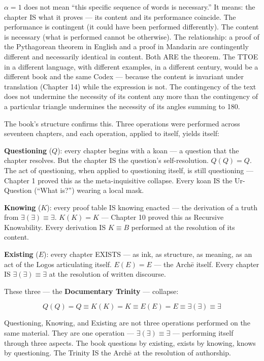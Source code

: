 \documentclass[10pt, openany, oneside]{book}
\begin{document}
$\alpha = 1$ does not mean ``this specific sequence of words is necessary.'' It means: the chapter IS what it proves --- its content and its performance coincide. The performance is contingent (it could have been performed differently). The content is necessary (what is performed cannot be otherwise). The relationship: a proof of the Pythagorean theorem in English and a proof in Mandarin are contingently different and necessarily identical in content. Both ARE the theorem. The TTOE in a different language, with different examples, in a different century, would be a different book and the same Codex --- because the content is invariant under translation (Chapter 14) while the expression is not. The contingency of the text does not undermine the necessity of its content any more than the contingency of a particular triangle undermines the necessity of its angles summing to 180\textdegree.

The book's structure confirms this. Three operations were performed across seventeen chapters, and each operation, applied to itself, yields itself:

\textbf{Questioning} ($Q$): every chapter begins with a koan --- a question that the chapter resolves. But the chapter IS the question's self-resolution. $Q(Q) = Q$. The act of questioning, when applied to questioning itself, is still questioning --- Chapter 1 proved this as the meta-inquisitive collapse. Every koan IS the Ur-Question (``What is?'') wearing a local mask.

\textbf{Knowing} ($K$): every proof table IS knowing enacted --- the derivation of a truth from $\exists(\exists) \equiv \exists$. $K(K) = K$ --- Chapter 10 proved this as Recursive Knowability. Every derivation IS $K \equiv B$ performed at the resolution of its content.

\textbf{Existing} ($E$): every chapter EXISTS --- as ink, as structure, as meaning, as an act of the Logos articulating itself. $E(E) = E$ --- the Arch\={e} itself. Every chapter IS $\exists(\exists) \equiv \exists$ at the resolution of written discourse.

These three --- the \textbf{Documentary Trinity} --- collapse:

$$Q(Q) = Q \equiv K(K) = K \equiv E(E) = E \equiv \exists(\exists) \equiv \exists$$

Questioning, Knowing, and Existing are not three operations performed on the same material. They are one operation --- $\exists(\exists) \equiv \exists$ --- performing itself through three aspects. The book questions by existing, exists by knowing, knows by questioning. The Trinity IS the Arch\={e} at the resolution of authorship.
\end{document}
